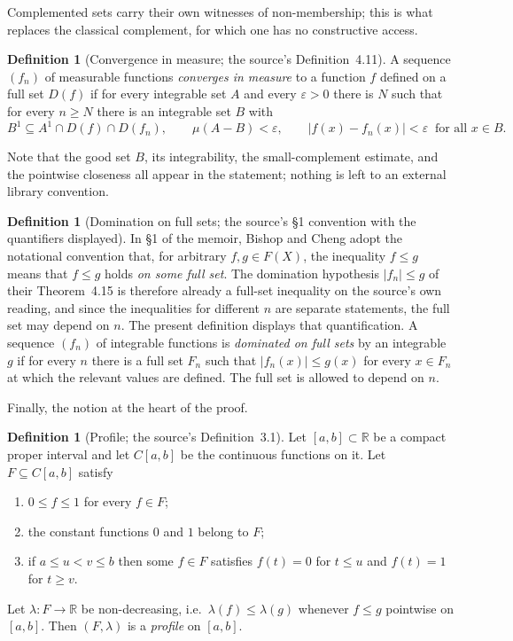 \documentclass[11pt]{article}
\theoremstyle{definition}
\newtheorem{definition}[theorem]{Definition}
\theoremstyle{remark}
\begin{document}
Complemented sets carry their own witnesses of non-membership; this is what replaces the classical complement, for which one has no constructive access.

\begin{definition}[Convergence in measure; the source's Definition~4.11]
\label{def:convmeasure}
A sequence $(f_n)$ of measurable functions \emph{converges in measure} to a function $f$ defined on a full set $D(f)$ if for every integrable set $A$ and every $\varepsilon>0$ there is $N$ such that for every $n\ge N$ there is an integrable set $B$ with
\[
B^1\subseteq A^1\cap D(f)\cap D(f_n),\qquad \mu(A-B)<\varepsilon,\qquad |f(x)-f_n(x)|<\varepsilon \ \text{ for all } x\in B .
\]
\end{definition}

Note that the good set $B$, its integrability, the small-complement estimate, and the pointwise closeness all appear in the statement; nothing is left to an external library convention.

\begin{definition}[Domination on full sets; the source's \S1 convention with the quantifiers displayed]
\label{def:domination}
In \S1 of the memoir, Bishop and Cheng adopt the notational convention that, for arbitrary $f,g\in F(X)$, the inequality $f\le g$ means that $f\le g$ holds \emph{on some full set}.  The domination hypothesis $|f_n|\le g$ of their Theorem~4.15 is therefore already a full-set inequality on the source's own reading, and since the inequalities for different $n$ are separate statements, the full set may depend on $n$.  The present definition displays that quantification.  A sequence $(f_n)$ of integrable functions is \emph{dominated on full sets} by an integrable $g$ if for every $n$ there is a full set $F_n$ such that $|f_n(x)|\le g(x)$ for every $x\in F_n$ at which the relevant values are defined.  The full set is allowed to depend on $n$.
\end{definition}

Finally, the notion at the heart of the proof.

\begin{definition}[Profile; the source's Definition~3.1]
\label{def:profile}
Let $[a,b]\subset\mathbb{R}$ be a compact proper interval and let $C[a,b]$ be the continuous functions on it.  Let $F\subseteq C[a,b]$ satisfy
\begin{enumerate}[label=(\alph*)]
\item $0\le f\le 1$ for every $f\in F$;
\item the constant functions $0$ and $1$ belong to $F$;
\item if $a\le u<v\le b$ then some $f\in F$ satisfies $f(t)=0$ for $t\le u$ and $f(t)=1$ for $t\ge v$.
\end{enumerate}
Let $\lambda:F\to\mathbb{R}$ be non-decreasing, i.e.\ $\lambda(f)\le\lambda(g)$ whenever $f\le g$ pointwise on $[a,b]$.  Then $(F,\lambda)$ is a \emph{profile} on $[a,b]$.
\end{definition}
\end{document}
